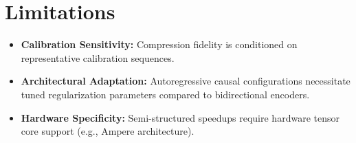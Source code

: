 \section{Limitations}

\begin{itemize}
\item \textbf{Calibration Sensitivity:} Compression fidelity is conditioned on representative calibration sequences.
\item \textbf{Architectural Adaptation:} Autoregressive causal configurations necessitate tuned regularization parameters compared to bidirectional encoders.
\item \textbf{Hardware Specificity:} Semi-structured speedups require hardware tensor core support (e.g., Ampere architecture).
\end{itemize}
